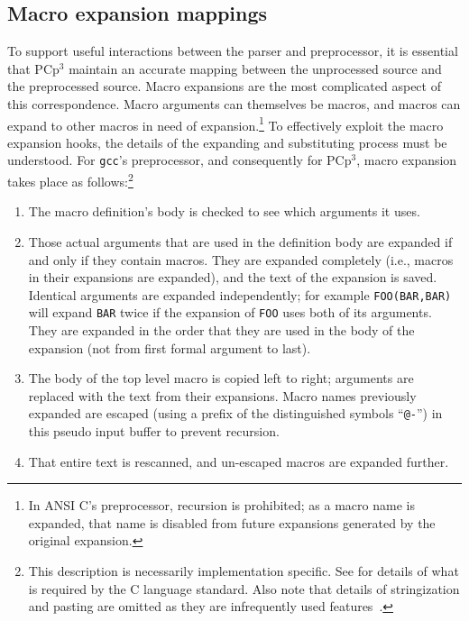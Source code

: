 \documentclass{article}
\newcommand{\pcp}{\mbox{\textsf{PCp}$^3$}}
\newcommand{\C}{\mbox{C}}
\newcommand{\ie}{i.e.,}
\begin{document}
\subsection{Macro expansion mappings}
To support useful interactions between the parser and preprocessor, it
is essential that \pcp{} maintain an accurate mapping between the
unprocessed source and the preprocessed source.  Macro expansions are
the most complicated aspect of this correspondence.  Macro arguments can
themselves be macros, and macros can expand to other macros in need of
expansion.\footnote{In ANSI \C{}'s preprocessor, recursion is
  prohibited; as a macro name is expanded, that name is disabled from
  future expansions generated by the original expansion.}  To
effectively exploit the macro expansion hooks, the details of the
expanding and substituting process must be understood.  For
\texttt{gcc}'s preprocessor, and consequently for \pcp{}, macro
expansion takes place as follows:\footnote{This description is necessarily
  implementation specific.  See \cite[Ch.~3]{Harbison91} for details of
  what is required by the \C{} language standard.  Also note that
  details of stringization and pasting are omitted as they are
  infrequently used features~\cite{EmpCpp}.}

\begin{enumerate}
\item The macro definition's body is checked to see which arguments it uses.
\item Those actual arguments that are used in the definition body are
      expanded if and only if they contain macros.  They are expanded
      completely (\ie{} macros in their expansions are expanded), and
      the text of the expansion is saved.  Identical arguments are
      expanded independently; for example \texttt{FOO(BAR,BAR)} will
      expand \texttt{BAR} twice if the expansion of \texttt{FOO} uses
      both of its arguments.  They are expanded in the order that they
      are used in the body of the expansion (not from first formal
      argument to last).
\item The body of the top level macro is copied left to right; arguments
      are replaced with the text from their expansions.  Macro names
      previously expanded are escaped (using a prefix of the
      distinguished symbols ``\texttt{@-}'') in this pseudo input buffer
      to prevent recursion.
\item That entire text is rescanned, and un-escaped macros are expanded
      further.
\end{enumerate}
\end{document}
